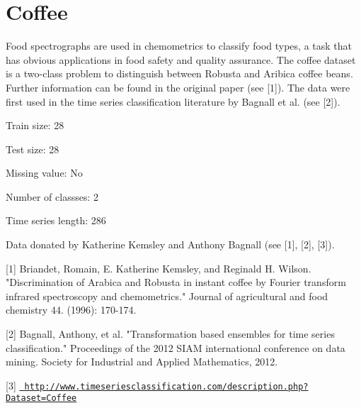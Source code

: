 \chapter{Coffee}
\hypertarget{md_external_2data_2UCRArchive__2018_2Coffee_2README}{}\label{md_external_2data_2UCRArchive__2018_2Coffee_2README}
\label{md_external_2data_2UCRArchive__2018_2Coffee_2README_autotoc_md35}%
%
 Food spectrographs are used in chemometrics to classify food types, a task that has obvious applications in food safety and quality assurance. The coffee dataset is a two-\/class problem to distinguish between Robusta and Aribica coffee beans. Further information can be found in the original paper (see \mbox{[}1\mbox{]}). The data were first used in the time series classification literature by Bagnall et al. (see \mbox{[}2\mbox{]}).

Train size\+: 28

Test size\+: 28

Missing value\+: No

Number of classses\+: 2

Time series length\+: 286

Data donated by Katherine Kemsley and Anthony Bagnall (see \mbox{[}1\mbox{]}, \mbox{[}2\mbox{]}, \mbox{[}3\mbox{]}).

\mbox{[}1\mbox{]} Briandet, Romain, E. Katherine Kemsley, and Reginald H. Wilson. "{}\+Discrimination of Arabica and Robusta in instant coffee by Fourier transform infrared spectroscopy and chemometrics."{} Journal of agricultural and food chemistry 44. (1996)\+: 170-\/174.

\mbox{[}2\mbox{]} Bagnall, Anthony, et al. "{}\+Transformation based ensembles for time series classification."{} Proceedings of the 2012 SIAM international conference on data mining. Society for Industrial and Applied Mathematics, 2012.

\mbox{[}3\mbox{]} \href{http://www.timeseriesclassification.com/description.php?Dataset=Coffee}{\texttt{ http\+://www.\+timeseriesclassification.\+com/description.\+php?\+Dataset=\+Coffee}} 